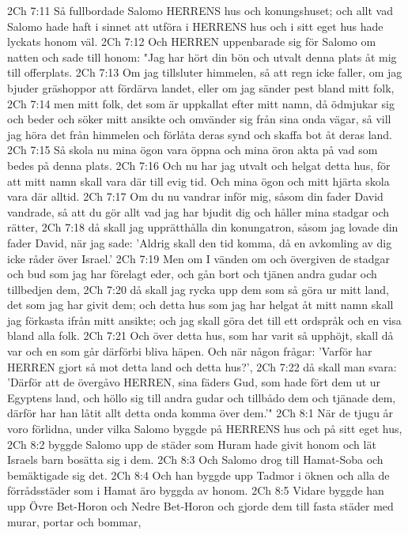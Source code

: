2Ch 7:11  Så fullbordade Salomo HERRENS hus och konungshuset; och allt vad Salomo hade haft i sinnet att utföra i HERRENS hus och i sitt eget hus hade lyckats honom väl.
2Ch 7:12  Och HERREN uppenbarade sig för Salomo om natten och sade till honom: "Jag har hört din bön och utvalt denna plats åt mig till offerplats.
2Ch 7:13  Om jag tillsluter himmelen, så att regn icke faller, om jag bjuder gräshoppor att fördärva landet, eller om jag sänder pest bland mitt folk,
2Ch 7:14  men mitt folk, det som är uppkallat efter mitt namn, då ödmjukar sig och beder och söker mitt ansikte och omvänder sig från sina onda vägar, så vill jag höra det från himmelen och förlåta deras synd och skaffa bot åt deras land.
2Ch 7:15  Så skola nu mina ögon vara öppna och mina öron akta på vad som bedes på denna plats.
2Ch 7:16  Och nu har jag utvalt och helgat detta hus, för att mitt namn skall vara där till evig tid. Och mina ögon och mitt hjärta skola vara där alltid.
2Ch 7:17  Om du nu vandrar inför mig, såsom din fader David vandrade, så att du gör allt vad jag har bjudit dig och håller mina stadgar och rätter,
2Ch 7:18  då skall jag upprätthålla din konungatron, såsom jag lovade din fader David, när jag sade: 'Aldrig skall den tid komma, då en avkomling av dig icke råder över Israel.'
2Ch 7:19  Men om I vänden om och övergiven de stadgar och bud som jag har förelagt eder, och gån bort och tjänen andra gudar och tillbedjen dem,
2Ch 7:20  då skall jag rycka upp dem som så göra ur mitt land, det som jag har givit dem; och detta hus som jag har helgat åt mitt namn skall jag förkasta ifrån mitt ansikte; och jag skall göra det till ett ordspråk och en visa bland alla folk.
2Ch 7:21  Och över detta hus, som har varit så upphöjt, skall då var och en som går därförbi bliva häpen. Och när någon frågar: 'Varför har HERREN gjort så mot detta land och detta hus?',
2Ch 7:22  då skall man svara: 'Därför att de övergåvo HERREN, sina fäders Gud, som hade fört dem ut ur Egyptens land, och höllo sig till andra gudar och tillbådo dem och tjänade dem, därför har han låtit allt detta onda komma över dem.'"
2Ch 8:1  När de tjugu år voro förlidna, under vilka Salomo byggde på HERRENS hus och på sitt eget hus,
2Ch 8:2  byggde Salomo upp de städer som Huram hade givit honom och lät Israels barn bosätta sig i dem.
2Ch 8:3  Och Salomo drog till Hamat-Soba och bemäktigade sig det.
2Ch 8:4  Och han byggde upp Tadmor i öknen och alla de förrådsstäder som i Hamat äro byggda av honom.
2Ch 8:5  Vidare byggde han upp Övre Bet-Horon och Nedre Bet-Horon och gjorde dem till fasta städer med murar, portar och bommar,
